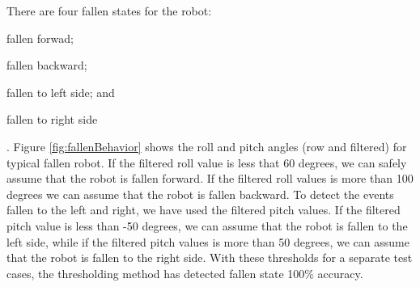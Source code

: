 \documentclass{llncs}
\begin{document}
\begin{sloppy}
There are four fallen states for the robot: \begin{inparaenum}[(1)] \item fallen
forwad; \item fallen backward; \item fallen to left side; and \item fallen to right
side\end{inparaenum}. Figure \ref{fig:fallenBehavior} shows the roll and pitch angles (row and
filtered) for typical fallen robot. If the filtered roll value is less that 60 degrees, we can
safely assume that the robot is fallen forward. If the filtered roll values is more than 100
degrees we can assume that the robot is fallen backward. To detect the events fallen to the left
and right, we have used the filtered pitch values. If the filtered pitch value is less than -50
degrees, we can assume that the robot is fallen to the left side, while if the filtered pitch
values is more than 50 degrees, we can assume that the robot is fallen to the right side. With
these thresholds for a separate test cases, the thresholding method has detected fallen state 100\%
accuracy. 


\end{sloppy}
\end{document}
